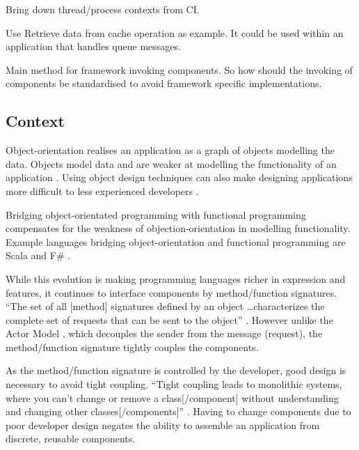 \documentclass[prodmode]{style/acmlarge}
\begin{document}
Bring down thread/process contexts from CI.

Use Retrieve data from cache operation as example.  It could be used within an
application that handles queue messages.

Main method for framework invoking components.  So how should the invoking of
components be standardised to avoid framework specific implementations.


\subsection{Context}



Object-orientation realises an application as a graph of objects modelling the
data.  Objects model data and are weaker at modelling the functionality of an
application \cite{oo-behaviour}.  Using object design techniques can also make
designing applications more difficult to less experienced developers
\cite{oo-design}.

Bridging object-orientated programming with functional programming
\cite{bridging-function-oo} compensates for the weakness of
objection-orientation in modelling functionality.  Example languages bridging
object-orientation and functional programming are Scala \cite{scala} and F\#
\cite{f-sharp}.

While this evolution is making programming languages richer in expression and
features, it continues to interface components by method/function signatures.
``The set of all [method] signatures defined by an object \ldots characterizes
the complete set of requests that can be sent to the object'' \cite[p. 13]{gof}.
 However unlike the Actor Model \cite{actors}, which decouples the sender from
the message (request), the method/function signature tightly couples the
components.

As the method/function signature is controlled by the developer, good design is
necessary to avoid tight coupling.  ``Tight coupling leads to monolithic
systems, where you can't change or remove a class[/component] without
understanding and changing other classes[/components]'' \cite[p. 24-25]{gof}.
Having to change components due to poor developer design negates the ability to
assemble an application from discrete, reusable components.
\end{document}
